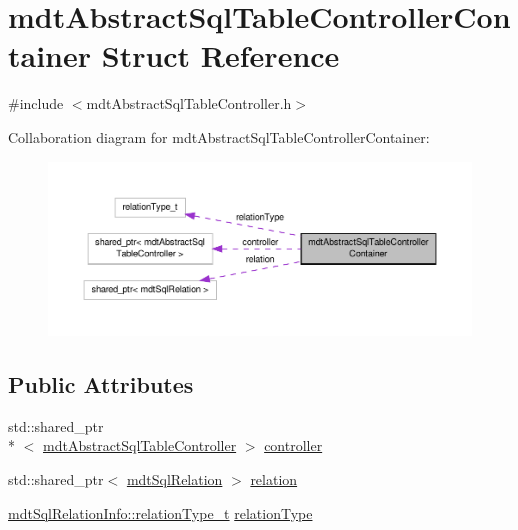 \hypertarget{structmdt_abstract_sql_table_controller_container}{\section{mdt\-Abstract\-Sql\-Table\-Controller\-Container Struct Reference}
\label{structmdt_abstract_sql_table_controller_container}
}


{\ttfamily \#include $<$mdt\-Abstract\-Sql\-Table\-Controller.\-h$>$}



Collaboration diagram for mdt\-Abstract\-Sql\-Table\-Controller\-Container\-:\nopagebreak
\begin{figure}[H]
\begin{center}
\leavevmode
\includegraphics[width=350pt]{structmdt_abstract_sql_table_controller_container__coll__graph}
\end{center}
\end{figure}
\subsection*{Public Attributes}
\begin{DoxyCompactItemize}
\item 
std\-::shared\-\_\-ptr\\*
$<$ \hyperlink{classmdt_abstract_sql_table_controller}{mdt\-Abstract\-Sql\-Table\-Controller} $>$ \hyperlink{structmdt_abstract_sql_table_controller_container_a78aed5460ebf7f78d18ac80bb855fa39}{controller}
\item 
std\-::shared\-\_\-ptr$<$ \hyperlink{classmdt_sql_relation}{mdt\-Sql\-Relation} $>$ \hyperlink{structmdt_abstract_sql_table_controller_container_ac628635f902685e4c5c15f7cc2327af9}{relation}
\item 
\hyperlink{classmdt_sql_relation_info_af36930de03b1cb16976f35987df2029e}{mdt\-Sql\-Relation\-Info\-::relation\-Type\-\_\-t} \hyperlink{structmdt_abstract_sql_table_controller_container_a95e403f88110d0b5f94b39be887226db}{relation\-Type}
\end{DoxyCompactItemize}


